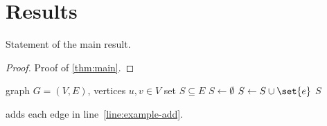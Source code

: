 \section{Results}
\label{sec:results}

\begin{theorem}
\label{thm:main}
Statement of the main result.
\end{theorem}

\begin{proof}
Proof of \cref{thm:main}.
\end{proof}


\begin{algorithm}[tb]
  \caption{Example procedure.}
  \label{alg:example}
  \begin{algorithmic}[1]
    \Require graph $G = (V, E)$, vertices $u, v \in V$
    \Ensure set $S \subseteq E$
    \State $S \gets \emptyset$
     
      \State $S \gets S \cup \set{e}$ \label{line:example-add}
    \EndFor
    \State \Return $S$
  \end{algorithmic}
\end{algorithm}

 adds each edge in line~\ref{line:example-add}.
